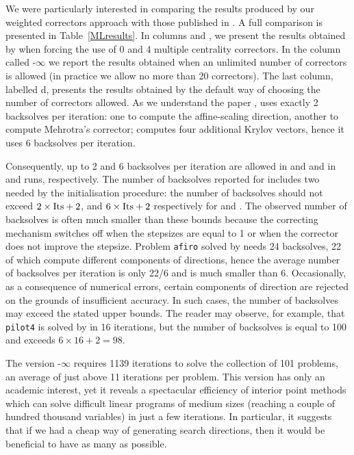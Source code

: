 We were particularly interested in comparing the results produced by our 
weighted correctors approach with those published in \cite{MehrotraLi}. 
A full comparison is presented in Table~\ref{MLresults}.
In columns  and , we present 
the results obtained by \HOPDM when forcing the use of 0 and 4 
multiple centrality correctors. 
In the column called \HO-$\infty$ we report the results 
obtained when an unlimited number of correctors is allowed
(in practice we allow no more than 20 correctors).
The last column, labelled d\HO, presents the results obtained 
by the default way of choosing the number of correctors allowed.
As we understand the paper \cite{MehrotraLi},  uses exactly 
2 backsolves per iteration: one to compute the affine-scaling direction,
another to compute Mehrotra's corrector;  computes
four additional Krylov vectors, hence it uses
6 backsolves per iteration.

Consequently, up to 2 and 6 backsolves per iteration are allowed
in  and  and in  and  runs, respectively.
The number of backsolves reported for \HOPDM includes two needed by 
the initialisation procedure: the number of backsolves 
should not exceed $2 \times {\rm {Its}} + 2$, 
and $6 \times {\rm {Its}} + 2$ respectively
for  and .
The observed number of backsolves is often much smaller
than these bounds because the correcting mechanism switches off 
when the stepsizes are equal to 1 or when the corrector does not 
improve the stepsize. Problem {\tt afiro} solved by  needs 24 
backsolves, 22 of which compute different components of directions, 
hence the average number of backsolves per iteration is only 22/6 
and is much smaller than 6. Occasionally,
as a consequence of numerical errors, certain components 
of direction are rejected on the grounds of insufficient accuracy.
In such cases, the number of backsolves may exceed the stated upper bounds.
The reader may observe, for example, that {\tt pilot4} is solved by 
in 16 iterations, but the number of backsolves is equal to 100 and 
exceeds $6 \times 16 + 2 = 98$.

The version \HO-$\infty$ requires 1139 iterations to solve 
the collection of 101 problems, an average of just above 11 iterations
per problem. This version has only an academic interest, 
yet it reveals a spectacular efficiency of interior point 
methods which can solve difficult linear programs of medium sizes 
(reaching a couple of hundred thousand variables) in just 
a few iterations.
In particular, it suggests that if we had a cheap way of generating
search directions, then it would be beneficial to have as many as possible.

